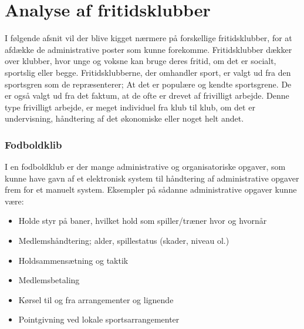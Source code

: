 \chapter{Analyse af fritidsklubber} \label{Fritidsklubber}

I følgende afsnit vil der blive kigget nærmere på forskellige fritidsklubber, for at afdække de administrative poster som kunne
forekomme. Fritidsklubber dækker over klubber, hvor unge og voksne kan bruge deres fritid, om det er
socialt, sportslig eller begge. Fritidsklubberne, der omhandler sport, er valgt ud fra den sportsgren som de
repræsenterer; At det er populære og kendte sportsgrene. De er også valgt ud fra det faktum, at de ofte er drevet af
frivilligt arbejde. Denne type frivilligt arbejde, er meget individuel fra klub til klub, om det er undervisning,
håndtering af det økonomiske eller noget helt andet. 

\subsection{Fodboldklib} \label{Fodbold}
I en fodboldklub er der mange administrative og organisatoriske opgaver, som kunne have gavn af et elektronisk system
til håndtering af administrative opgaver frem for et manuelt system. Eksempler på sådanne
administrative opgaver kunne være:

\begin{itemize}
\item Holde styr på baner, hvilket hold som spiller/træner hvor og hvornår
\item Medlemshåndtering; alder, spillestatus (skader, niveau ol.)
\item Holdsammensætning og taktik 
\item Medlemsbetaling
\item Kørsel til og fra arrangementer og lignende
\item Pointgivning ved lokale sportsarrangementer
\end{itemize}

